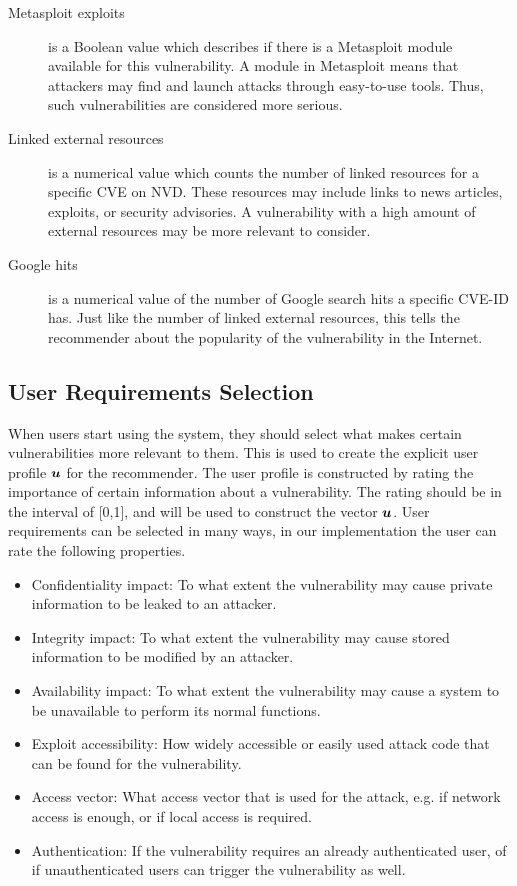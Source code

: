{\begin{description}
	\item[Metasploit exploits] is a Boolean value which describes if there is a Metasploit module~\cite{metasploit} available for this vulnerability. A module in Metasploit means that attackers may find and launch attacks through easy-to-use tools. Thus, such vulnerabilities are considered more serious.
	\item[Linked external resources] is a numerical value which counts the number of linked resources for a specific CVE on NVD. These resources may include links to news articles, exploits, or security advisories. A vulnerability with a high amount of external resources may be more relevant to consider.
	\item[Google hits] is a numerical value of the number of Google search hits a specific CVE-ID has. Just like the number of linked external resources, this tells the recommender about the popularity of the vulnerability in the Internet.
\end{description}

\subsection{User Requirements Selection} \label{sec:userreqselection}
When users start using the system, they should select what makes certain vulnerabilities more relevant to them.
This is used to create the explicit user profile $\bm{u}$ for the recommender.
The user profile is constructed by rating the importance of certain information about a vulnerability.
The rating should be in the interval of [0,1], and will be used to construct the vector $\bm{u}$.
User requirements can be selected in many ways, in our implementation the user can rate the following properties.
\begin{itemize}
	\item Confidentiality impact: To what extent the vulnerability may cause private information to be leaked to an attacker.
	\item Integrity impact: To what extent the vulnerability may cause stored information to be modified by an attacker.
	\item Availability impact: To what extent the vulnerability may cause a system to be unavailable to perform its normal functions.
	\item Exploit accessibility: How widely accessible or easily used attack code that can be found for the vulnerability.
	\item Access vector: What access vector that is used for the attack, e.g. if network access is enough, or if local access is required.
	\item Authentication: If the vulnerability requires an already authenticated user, of if unauthenticated users can trigger the vulnerability as well.
\end{itemize}

}
